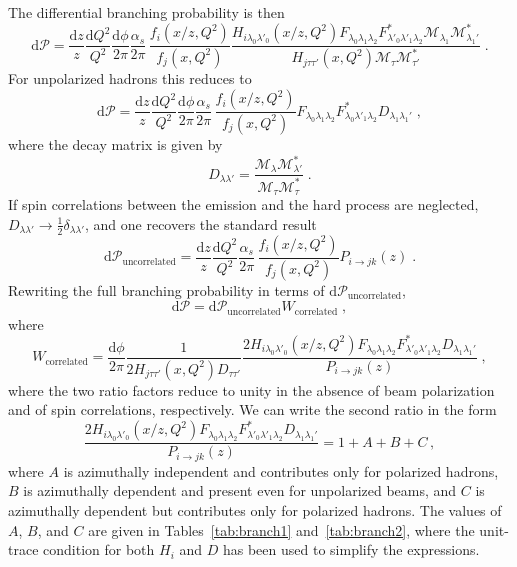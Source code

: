 \documentclass[a4paper,11pt]{article}
\begin{document}
The differential branching probability is then
\begin{equation}
  \mathrm{d}\mathcal{P} = \frac{\mathrm{d}z}z \frac{\mathrm{d}Q^2}{Q^2} \frac{\mathrm{d}\phi}{2\pi}\frac{\alpha_s}{2\pi}\,
  \frac{f_i\left(x/z,Q^2\right) }{ f_j(x,Q^2) }
  \frac{H_{i\lambda_0\lambda'_0}\left(x/z,Q^2\right) F_{\lambda_0\lambda_1\lambda_2} F^*_{\lambda'_0\lambda'_1\lambda_2} \mathcal{M}_{\lambda_1}\mathcal{M}^*_{\lambda_1'}}{H_{j\tau\tau'}(x,Q^2) \mathcal{M}_\tau\mathcal{M}^*_{\tau'}}\;.
\end{equation}
For unpolarized hadrons this reduces to
\begin{equation}
  \mathrm{d}\mathcal{P} = \frac{\mathrm{d}z}z \frac{\mathrm{d}Q^2}{Q^2} \frac{\mathrm{d}\phi}{2\pi}\frac{\alpha_s}{2\pi}\,
  \frac{f_i\left(x/z,Q^2\right) }{ f_j(x,Q^2) }
  F_{\lambda_0\lambda_1\lambda_2} F^*_{\lambda_0\lambda'_1\lambda_2} D_{\lambda_1\lambda_1'}\;,
\end{equation}
where the decay matrix is given by
\begin{equation}
  D_{\lambda\lambda'} = \frac{\mathcal{M}_{\lambda}\mathcal{M}^*_{\lambda'}}{\mathcal{M}_\tau\mathcal{M}^*_{\tau}}\;.
\end{equation}
If spin correlations between the emission and the hard process are neglected, $D_{\lambda\lambda'}\to \frac12\delta_{\lambda\lambda'}$,
and one recovers the standard result
\begin{equation}
  \mathrm{d}\mathcal{P}_\mathrm{uncorrelated} = \frac{\mathrm{d}z}z \frac{\mathrm{d}Q^2}{Q^2} \frac{\alpha_s}{2\pi}\,
  \frac{f_i\left(x/z,Q^2\right) }{ f_j(x,Q^2) } P_{i\to jk}(z)\;.
\end{equation}
Rewriting the full branching probability in terms of $\mathrm{d}\mathcal{P}_\mathrm{uncorrelated}$,
\begin{equation}
  \mathrm{d}\mathcal{P} = \mathrm{d}\mathcal{P}_\mathrm{uncorrelated} W_\mathrm{correlated}\;,
\end{equation}
where
\begin{equation}
  W_\mathrm{correlated} =
  \frac{\mathrm{d}\phi}{2\pi}\frac1{2H_{j\tau\tau'}(x,Q^2) D_{\tau\tau'}}
  \frac{2H_{i\lambda_0\lambda'_0}\left(x/z,Q^2\right) F_{\lambda_0\lambda_1\lambda_2} F^*_{\lambda'_0\lambda'_1\lambda_2}D_{\lambda_1\lambda_1'}}{P_{i\to jk}(z)}\;,
\end{equation}
where the two ratio factors reduce to unity in the absence of beam polarization and of spin correlations, respectively.
We can write the second ratio in the form
\begin{equation}
   \frac{2H_{i\lambda_0\lambda'_0}\left(x/z,Q^2\right) F_{\lambda_0\lambda_1\lambda_2} F^*_{\lambda'_0\lambda'_1\lambda_2}D_{\lambda_1\lambda_1'}}{P_{i\to jk}(z)} = 1 + A + B + C\,,\label{eqn:corr}
\end{equation}
where $A$ is azimuthally independent and contributes only for polarized hadrons, $B$ is azimuthally dependent and present even for unpolarized beams, and $C$ is azimuthally dependent but contributes only for polarized hadrons.
The values of $A$, $B$, and $C$ are given in Tables~\ref{tab:branch1} and~\ref{tab:branch2}, where the unit-trace condition for both $H_i$ and $D$ has been used to simplify the expressions.
\end{document}

